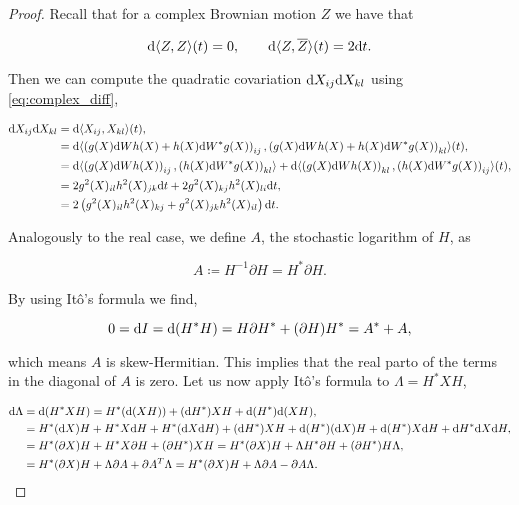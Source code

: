 \begin{proof} 
    Recall that for a complex Brownian motion $Z$ we have that


    \[\mathrm d\langle Z,Z\rangle(t) = 0, \qquad \mathrm d \langle Z ,\overline Z\rangle(t) = 2\mathrm d t.\]

    
    Then we can compute the quadratic covariation $\mathrm d X_{ij}\mathrm d X_{kl}$ using \eqref{eq:complex_diff},

    \begin{align}
        \mathrm d X_{ij}\mathrm d X_{kl} &=  \mathrm d\langle X_{ij},X_{kl} \rangle(t), \\
        &= \mathrm d\langle \left( g(X)\mathrm d  W h(X) + h(X)\mathrm d W^* g(X) \right)_{ij}, \left(g(X)\mathrm d W h(X) + h(X)\mathrm d W^* g(X)\right)_{kl} \rangle(t),\\
        &= \mathrm d\langle \left(g(X)\mathrm d  W h(X)\right)_{ij}, \left(h(X)\mathrm d W^* g(X)\right)_{kl}\rangle + \mathrm d\langle \left(g(X)\mathrm d  W h(X)\right)_{kl}, \left(h(X)\mathrm d W^* g(X)\right)_{ij}\rangle(t),\\
        &= 2g^2(X)_{il}h^2(X)_{jk}\mathrm d t + 2g^2(X)_{kj}h^2(X)_{li}\mathrm d t,\\
        &= 2\left( g^2(X)_{il}h^2(X)_{kj} + g^2(X)_{jk}h^2(X)_{il} \right)\mathrm d t.
    \end{align}


    Analogously to the real case, we define $A$, the stochastic logarithm of $H$, as

    \begin{equation*}
        A \coloneqq H^{-1}\partial H = H^* \partial H.
    \end{equation*}

    By using Itô's formula we find,

    \begin{equation*}
        0 = \mathrm d I = \mathrm d(H^*H) = H \partial H^* + (\partial H) H^* = A^* + A,
    \end{equation*}

    \noindent which means $A$ is skew-Hermitian. This implies that the real parto of the terms in the diagonal of $A$ is zero. Let us now apply Itô's formula to $\Lambda = H^* X H$,

    \begin{align*} %
        \d \Lambda &= \d(H^* X H) = H^*(\d(XH)) + (\d H^*) XH + \d(H^*)\d (XH),\\
        &= H^*(\d X) H + H^* X \d H + H^*(\d X\d H) + (\d H^*)X H + \d(H^*)(\d X)H + \d(H^*)X\d H + \d H^*\d X\d H,\\
        &= H^*(\partial X)H + H^*X\partial H + (\partial H^*)XH = H^*(\partial X)H + \Lambda H^* \partial H + (\partial H^*)H\Lambda,\\
        &= H^*(\partial X)H + \Lambda \partial A + \trans{\partial A}\Lambda = H^*(\partial X)H + \Lambda \partial A - \partial A \Lambda.
    \end{align*}


\end{proof}
